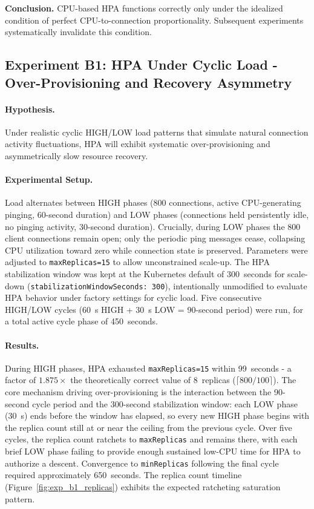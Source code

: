 \documentclass[twocolumn]{svjour3}
\begin{document}
\begin{keyresult}
\noindent\textbf{Conclusion.} CPU-based HPA functions correctly only under the idealized
condition of perfect CPU-to-connection proportionality. Subsequent experiments systematically
invalidate this condition.
\end{keyresult}

\subsection{Experiment B1: HPA Under Cyclic Load - Over-Provisioning and Recovery
Asymmetry}

\paragraph{Hypothesis.} Under realistic cyclic HIGH/LOW load patterns that simulate natural
connection activity fluctuations, HPA will exhibit systematic over-provisioning and
asymmetrically slow resource recovery.

\paragraph{Experimental Setup.} Load alternates between HIGH phases (800 connections, active
CPU-generating pinging, 60-second duration) and LOW phases (connections held persistently
idle, no pinging activity, 30-second duration). Crucially, during LOW phases the 800 client
connections remain open; only the periodic ping messages cease, collapsing CPU utilization
toward zero while connection state is preserved. Parameters were adjusted to
\texttt{maxReplicas=15} to allow unconstrained scale-up. The HPA stabilization window was
kept at the Kubernetes default of 300~seconds for scale-down
(\texttt{stabilizationWindowSeconds: 300}), intentionally unmodified to evaluate HPA behavior
under factory settings for cyclic load. Five consecutive HIGH/LOW cycles (60~s HIGH + 30~s LOW
= 90-second period) were run, for a total active cycle phase of 450~seconds.

\paragraph{Results.} During HIGH phases, HPA exhausted \texttt{maxReplicas=15} within
99~seconds - a factor of $1.875\times$ the theoretically correct value of 8~replicas
($\lceil800/100\rceil$). The core mechanism driving over-provisioning is the interaction
between the 90-second cycle period and the 300-second stabilization window: each LOW phase
(30~s) ends before the window has elapsed, so every new HIGH phase begins with the replica
count still at or near the ceiling from the previous cycle. Over five cycles, the replica
count ratchets to \texttt{maxReplicas} and remains there, with each brief LOW phase failing
to provide enough sustained low-CPU time for HPA to authorize a descent. Convergence to
\texttt{minReplicas} following the final cycle required approximately 650~seconds. The replica
count timeline (Figure~\ref{fig:exp_b1_replicas}) exhibits the expected ratcheting saturation
pattern.
\end{document}
